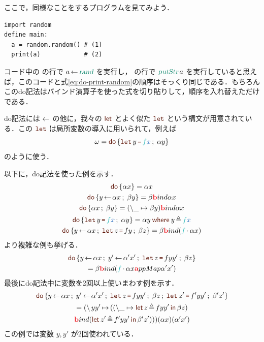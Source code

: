 \documentclass[a5paper,twoside,fleqn,draft]{jsbook}
\begin{document}
ここで，同様なことをする\python プログラムを見てみよう．
\begin{pythoncode}
\begin{verbatim}
import random
define main:
  a = random.random() # (1)
  print(a)            # (2)
\end{verbatim}
\end{pythoncode}
コード中の  の行で $a\mDoEq\mRand$ を実行し， の行で $\mPutStr a$ を実行していると思えば，このコードと式\eqref{eq:do-print-random}の順序はそっくり同じである．もちろんこのdo記法はバインド演算子を使った式を切り貼りして，順序を入れ替えただけである．

do記法には $\operatorname{\leftarrow}$ の他に，我々の $\mLetKeyword$ とよく似た $\mDoLetKeyword$ という構文が用意されている．この $\mDoLetKeyword$ は局所変数の導入に用いられて，例えば
\begin{equation}
\omega=\mDo{\mDoLet{y}{\hFunc{f}\hVar{x}}\mDoNext\alpha y}
\end{equation}
のように使う．

以下に，do記法を使った例を示す．
\begin{gather}
\mDo{\alpha x}=\alpha x\\
\mDo{y\mDoEq\alpha x\mDoNext\beta y}=\beta\hTypeName{b}ind\alpha x\\
\mDo{\alpha x\mDoNext\beta y}=(\hLambdaSyntax{\_}{\beta y})\hTypeName{b}ind \alpha x\label{eq:do-alpha-beta}\\
\mDo{\mDoLet{y}{\hFunc{f}\hVar{x}}\mDoNext\alpha y}=\alpha y\mWhereIsEXP{y}{\hFunc{f}\hVar{x}}\\
\mDo{y\mDoEq\alpha x\mDoNext\mDoLet{z}{fy}\mDoNext\beta z}
=\beta\hTypeName{b}ind{}(\hFunc{f}\mMap\alpha x)
\end{gather}
より複雑な例も挙げる．
\begin{multline}
\mDo{y\mDoEq\alpha x\mDoNext y'\mDoEq\alpha'x'\mDoNext\mDoLet{z}{fyy'}
\mDoNext\beta z}\\
=\beta\hTypeName{b}ind{}(\hFunc{f}\mMap\alpha x\hTypeName{a}ppMap\alpha'x')
\end{multline}
最後にdo記法中に変数を2回以上使いまわす例を示す．
\begin{multline}
\mDo{y\mDoEq\alpha x\mDoNext y'\mDoEq\alpha'x'\mDoNext\mDoLet{z}{fyy'}\mDoNext\beta z\mDoNext\mDoLet{z'}{f'yy'}\mDoNext\beta'z'}\\
=(\mLambda yy'\mLambdaArrow{}((\hLambdaSyntax{\_}{\mLetInEXP{z}{fyy'}{\beta z}})\\
\hTypeName{b}ind{}(\mLetInEXP{z'}{f'yy'}{\beta'z'}))) (\alpha x)(\alpha'x')
\end{multline}
この例では変数 $y,y'$ が2回使われている．
\end{document}
